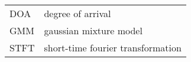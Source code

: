 \begin{tabular}{p{6cm}l}
DOA			&	degree of arrival\\
GMM         &   gaussian mixture model\\
STFT        &   short-time fourier transformation\\
\end{tabular}
